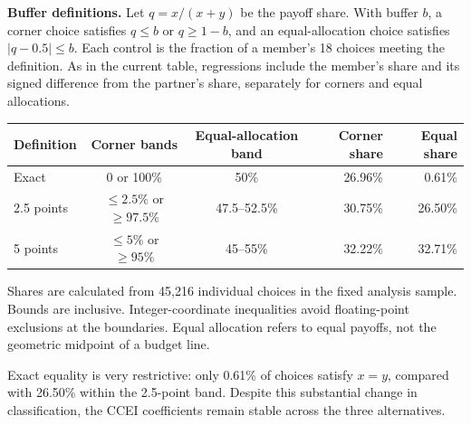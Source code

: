 \documentclass[11pt]{article}
\begin{document}
\textbf{Buffer definitions.} Let $q=x/(x+y)$ be the payoff share. With buffer $b$, a corner choice satisfies $q\leq b$ or $q\geq 1-b$, and an equal-allocation choice satisfies $|q-0.5|\leq b$. Each control is the fraction of a member's 18 choices meeting the definition. As in the current table, regressions include the member's share and its signed difference from the partner's share, separately for corners and equal allocations.

\begin{center}
\small
\begin{tabular}{lccrr}
\toprule
Definition & Corner bands & Equal-allocation band & Corner share & Equal share\\
\midrule
Exact & 0 or 100\% & 50\% & 26.96\% & 0.61\% \\
2.5 points & $\leq2.5\%$ or $\geq97.5\%$ & 47.5--52.5\% & 30.75\% & 26.50\% \\
5 points & $\leq5\%$ or $\geq95\%$ & 45--55\% & 32.22\% & 32.71\% \\
\bottomrule
\end{tabular}
\end{center}
{\footnotesize Shares are calculated from 45,216 individual choices in the fixed analysis sample. Bounds are inclusive. Integer-coordinate inequalities avoid floating-point exclusions at the boundaries. Equal allocation refers to equal payoffs, not the geometric midpoint of a budget line.}

Exact equality is very restrictive: only 0.61\% of choices satisfy $x=y$, compared with 26.50\% within the 2.5-point band. Despite this substantial change in classification, the CCEI coefficients remain stable across the three alternatives.
\end{document}
